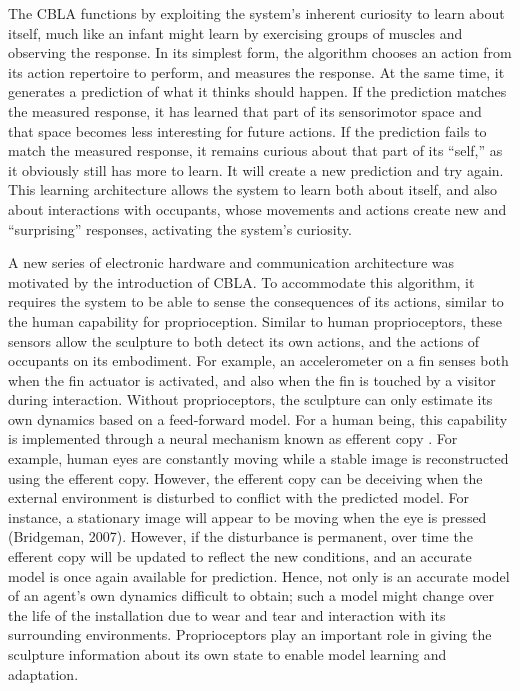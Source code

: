 The CBLA functions by exploiting the system’s inherent curiosity to learn about itself, much like an infant might learn by exercising groups of muscles and observing the response.  In its simplest form, the algorithm chooses an action from its action repertoire to perform, and measures the response.  At the same time, it generates a prediction of what it thinks should happen.  If the prediction matches the measured response, it has learned that part of its sensorimotor space and that space becomes less interesting for future actions.  If the prediction fails to match the measured response, it remains curious about that part of its “self,” as it obviously still has more to learn.  It will create a new prediction and try again.  This learning architecture allows the system to learn both about itself, and also about interactions with occupants, whose movements and actions create new and “surprising” responses, activating the system’s curiosity.

A new series of electronic hardware and communication architecture was motivated by the introduction of CBLA. To accommodate this algorithm, it requires the system to be able to sense the consequences of its actions, similar to the human capability for proprioception. Similar to human proprioceptors, these sensors allow the sculpture to both detect its own actions, and the actions of occupants on its embodiment. For example, an accelerometer on a fin senses both when the fin actuator is activated, and also when the fin is touched by a visitor during interaction. Without proprioceptors, the sculpture can only estimate its own dynamics based on a feed-forward model. For a human being, this capability is implemented through a neural mechanism known as efferent copy \cite{arbib2003handbook}. For example, human eyes are constantly moving while a stable image is reconstructed using the efferent copy. However, the efferent copy can be deceiving when the external environment is disturbed to conflict with the predicted model. For instance, a stationary image will appear to be moving when the eye is pressed (Bridgeman, 2007).  However, if the disturbance is permanent, over time the efferent copy will be updated to reflect the new conditions, and an accurate model is once again available for prediction. Hence, not only is an accurate model of an agent’s own dynamics difficult to obtain; such a model might change over the life of the installation due to wear and tear and interaction with its surrounding environments. Proprioceptors play an important role in giving the sculpture information about its own state to enable model learning and adaptation.

